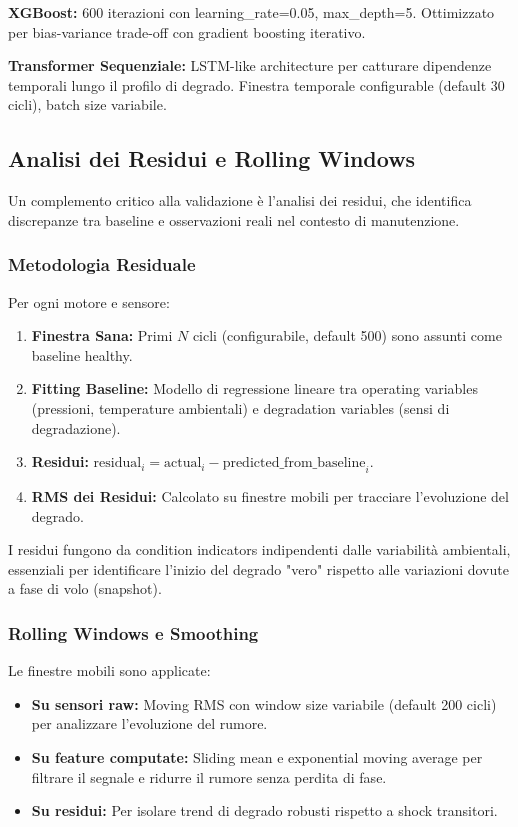 \textbf{XGBoost:} 600 iterazioni con learning\_rate=0.05, max\_depth=5. Ottimizzato per bias-variance trade-off con gradient boosting iterativo.

\textbf{Transformer Sequenziale:} LSTM-like architecture per catturare dipendenze temporali lungo il profilo di degrado. Finestra temporale configurable (default 30 cicli), batch size variabile.

\subsection{Analisi dei Residui e Rolling Windows}

Un complemento critico alla validazione è l'analisi dei residui, che identifica discrepanze tra baseline e osservazioni reali nel contesto di manutenzione.

\subsubsection{Metodologia Residuale}

Per ogni motore e sensore:
\begin{enumerate}
    \item \textbf{Finestra Sana:} Primi $N$ cicli (configurabile, default 500) sono assunti come baseline healthy.
    \item \textbf{Fitting Baseline:} Modello di regressione lineare tra operating variables (pressioni, temperature ambientali) e degradation variables (sensi di degradazione).
    \item \textbf{Residui:} $\text{residual}_i = \text{actual}_i - \text{predicted\_from\_baseline}_i$.
    \item \textbf{RMS dei Residui:} Calcolato su finestre mobili per tracciare l'evoluzione del degrado.
\end{enumerate}

I residui fungono da condition indicators indipendenti dalle variabilità ambientali, essenziali per identificare l'inizio del degrado "vero" rispetto alle variazioni dovute a fase di volo (snapshot).

\subsubsection{Rolling Windows e Smoothing}

Le finestre mobili sono applicate:
\begin{itemize}
    \item \textbf{Su sensori raw:} Moving RMS con window size variabile (default 200 cicli) per analizzare l'evoluzione del rumore.
    \item \textbf{Su feature computate:} Sliding mean e exponential moving average per filtrare il segnale e ridurre il rumore senza perdita di fase.
    \item \textbf{Su residui:} Per isolare trend di degrado robusti rispetto a shock transitori.
\end{itemize}

